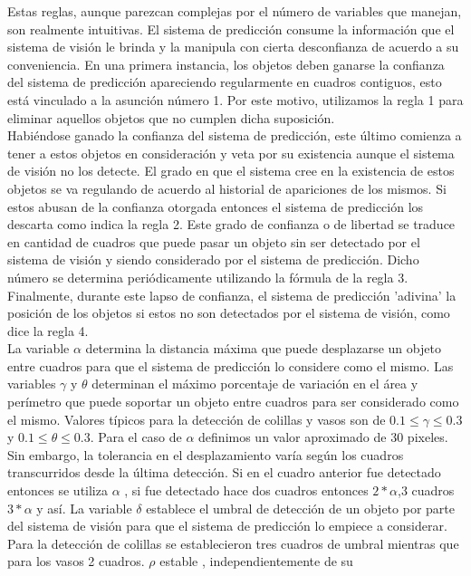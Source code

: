 Estas reglas, aunque parezcan complejas por el número de variables que 
manejan, son realmente intuitivas. El sistema de predicción consume la 
información que el sistema de visión le brinda y la manipula con 
cierta desconfianza de acuerdo a su 
conveniencia. En una primera instancia, los objetos deben ganarse la 
confianza del sistema de predicción apareciendo regularmente en 
cuadros contiguos, esto está vinculado a la asunción número 
1. Por este motivo, utilizamos la regla 1 para eliminar aquellos objetos que 
no cumplen dicha suposición. \\
	Habiéndose ganado la confianza del sistema de predicción, este 
	último comienza a tener a estos objetos en consideración y veta por su 
existencia aunque el sistema de visión no los detecte. El grado en que 
el sistema cree en la existencia de estos objetos se va regulando de 
acuerdo al historial de apariciones de los mismos. Si estos abusan de 
la confianza otorgada entonces el sistema de predicción los descarta 
como indica la regla 2. 
Este grado de confianza o de libertad se traduce en cantidad de 
cuadros que puede pasar un objeto sin ser detectado por el sistema de 
visión y siendo considerado por el sistema de predicción. Dicho 
número se determina periódicamente utilizando la fórmula de la regla 3.
Finalmente, durante este lapso de confianza, el sistema de predicción 
'adivina' la posición de los objetos si estos no son detectados por el 
sistema de visión, como dice la regla 4. \\
\indent La variable $\alpha$ determina la distancia máxima que puede 
desplazarse un objeto entre cuadros para que el sistema de predicción lo considere 
como el mismo. Las variables $\gamma$ y $\theta$ determinan el máximo 
porcentaje de variación en el área y perímetro que puede soportar un 
objeto entre cuadros para ser considerado como el mismo. Valores 
típicos para la detección de colillas y vasos son de 
$0.1\leq\gamma\leq0.3$ y $0.1\leq\theta\leq0.3$. Para el caso de 
$\alpha$ definimos un valor aproximado de 30 pixeles. Sin embargo, la 
tolerancia en el desplazamiento varía según los cuadros transcurridos desde la última 
detección. Si en el cuadro anterior fue detectado entonces se utiliza 
$\alpha$ , si fue detectado hace dos cuadros entonces $2*\alpha$,3 
cuadros $3*\alpha$ y así. La variable $\delta$ establece el umbral de 
detección de un objeto por parte del sistema de visión para que el 
sistema de predicción lo empiece  a considerar. Para la detección de 
colillas se establecieron tres cuadros de umbral mientras que para los 
vasos 2 cuadros. $\rho$ estable , independientemente de su 
